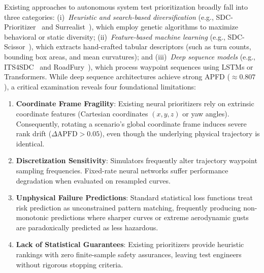 Existing approaches to autonomous system test prioritization broadly fall into three categories:
(i)~\emph{Heuristic and search-based diversification} (e.g., SDC-Prioritizer~\cite{sdcprio} and Surrealist~\cite{roadfury}), which employ genetic algorithms to maximize behavioral or static diversity;
(ii)~\emph{Feature-based machine learning} (e.g., SDC-Scissor~\cite{sdcscissor,saner}), which extracts hand-crafted tabular descriptors (such as turn counts, bounding box areas, and mean curvatures); and
(iii)~\emph{Deep sequence models} (e.g., ITS4SDC~\cite{its4sdc} and RoadFury~\cite{roadfury}), which process waypoint sequences using LSTMs or Transformers.
While deep sequence architectures achieve strong APFD ($\approx 0.807$), a critical examination reveals four foundational limitations:
\begin{enumerate}
    \item \textbf{Coordinate Frame Fragility}: Existing neural prioritizers rely on extrinsic coordinate features (Cartesian coordinates $(x, y, z)$ or yaw angles). Consequently, rotating a scenario's global coordinate frame induces severe rank drift ($\Delta\mathrm{APFD} > 0.05$), even though the underlying physical trajectory is identical.
    \item \textbf{Discretization Sensitivity}: Simulators frequently alter trajectory waypoint sampling frequencies. Fixed-rate neural networks suffer performance degradation when evaluated on resampled curves.
    \item \textbf{Unphysical Failure Predictions}: Standard statistical loss functions treat risk prediction as unconstrained pattern matching, frequently producing non-monotonic predictions where sharper curves or extreme aerodynamic gusts are paradoxically predicted as less hazardous.
    \item \textbf{Lack of Statistical Guarantees}: Existing prioritizers provide heuristic rankings with zero finite-sample safety assurances, leaving test engineers without rigorous stopping criteria.
\end{enumerate}

